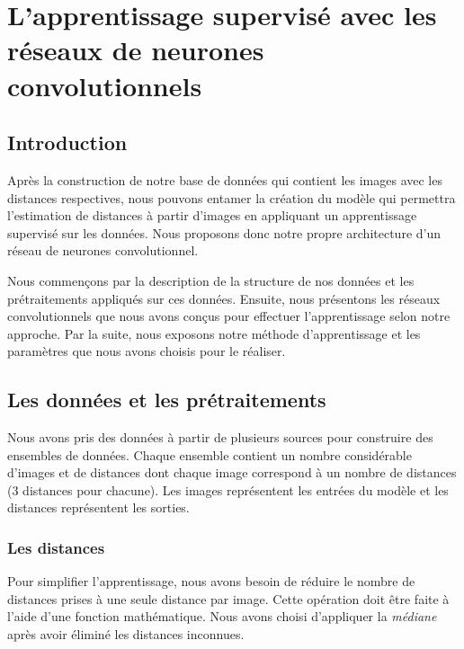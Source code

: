 \chapter{L'apprentissage supervisé avec les réseaux de neurones convolutionnels}

\section{Introduction}

Après la construction de notre base de données qui contient les images avec
les distances respectives, nous pouvons entamer la création du modèle qui
permettra l'estimation de distances à partir d'images en appliquant un
apprentissage supervisé sur les données. Nous proposons donc notre propre
architecture d'un réseau de neurones convolutionnel.

Nous commençons par la description de la structure de nos
données et les prétraitements appliqués sur ces données. Ensuite, nous présentons
les réseaux convolutionnels que nous avons conçus pour effectuer l'apprentissage
selon notre approche.
Par la suite, nous exposons notre méthode d'apprentissage et les paramètres
que nous avons choisis pour le réaliser.

\section{Les données et les prétraitements}

Nous avons pris des données à partir de plusieurs sources pour construire des
ensembles de données. Chaque ensemble contient un nombre considérable d'images et
de distances dont chaque image correspond à un nombre de distances ($3$ distances
pour chacune). Les images représentent les entrées du modèle et les distances
représentent les sorties.

\subsection{Les distances}

Pour simplifier l'apprentissage, nous avons besoin de réduire le nombre de
distances prises à une seule distance par image. Cette opération doit être faite
à l'aide d'une fonction mathématique. Nous avons choisi d'appliquer la
\emph{médiane} après avoir éliminé les distances inconnues.

